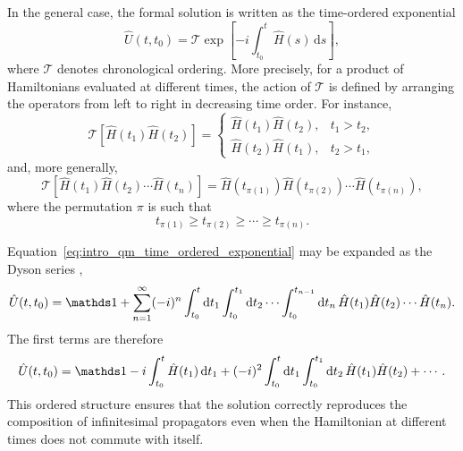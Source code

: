 In the general case, the formal solution is written as the time-ordered exponential
\begin{equation}
	\hat U(t,t_0)=\mathcal{T}\exp\left[-i\int_{t_0}^{t}\hat H(s)\,\mathrm{d}s\right],
	\label{eq:intro_qm_time_ordered_exponential}
\end{equation}
where $\mathcal{T}$ denotes chronological ordering. More precisely, for a product of Hamiltonians evaluated at different times, the action of $\mathcal{T}$ is defined by arranging the operators from left to right in decreasing time order. For instance,
\begin{equation}
	\mathcal{T}\!\left[\hat H(t_1)\hat H(t_2)\right]
	=
	\begin{cases}
		\hat H(t_1)\hat H(t_2), & t_1>t_2,\\
		\hat H(t_2)\hat H(t_1), & t_2>t_1,
	\end{cases}
	\label{eq:intro_qm_time_ordering_two_times}
\end{equation}
and, more generally,
\begin{equation}
	\mathcal{T}\!\left[\hat H(t_1)\hat H(t_2)\cdots \hat H(t_n)\right]
	=
	\hat H(t_{\pi(1)})\hat H(t_{\pi(2)})\cdots \hat H(t_{\pi(n)}),
	\label{eq:intro_qm_time_ordering_general_definition}
\end{equation}
where the permutation $\pi$ is such that
\begin{equation}
	t_{\pi(1)}\geq t_{\pi(2)}\geq \cdots \geq t_{\pi(n)}.
	\label{eq:intro_qm_time_ordering_permutation}
\end{equation}

Equation~\eqref{eq:intro_qm_time_ordered_exponential} may be expanded as the Dyson series \cite{Dyson49},
\begin{equation}
	\hat U(t,t_0)
	=
	\id
	+
	\sum_{n=1}^{\infty}
	(-i)^n
	\int_{t_0}^{t}\mathrm{d}t_1
	\int_{t_0}^{t_1}\mathrm{d}t_2
	\cdots
	\int_{t_0}^{t_{n-1}}\mathrm{d}t_n\,
	\hat H(t_1)\hat H(t_2)\cdots \hat H(t_n).
	\label{eq:intro_qm_dyson_series}
\end{equation}
The first terms are therefore
\begin{equation}
	\hat U(t,t_0)
	=
	\id
	-i\int_{t_0}^{t}\hat H(t_1)\,\mathrm{d}t_1
	+(-i)^2\int_{t_0}^{t}\mathrm{d}t_1\int_{t_0}^{t_1}\mathrm{d}t_2\,\hat H(t_1)\hat H(t_2)
	+\cdots.
	\label{eq:intro_qm_dyson_series_first_terms}
\end{equation}
This ordered structure ensures that the solution correctly reproduces the composition of infinitesimal propagators even when the Hamiltonian at different times does not commute with itself.


